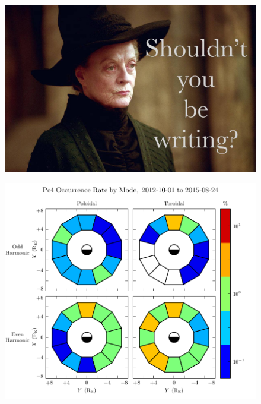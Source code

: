 \begin{figure}[!htb]
    \centering
    \includegraphics[width=\textwidth]{figures/placeholder.jpg}
    \caption[Distribution of Events by Spectral Width]{
    }
    \label{fig_fwhm}
\end{figure}






\begin{figure}[!htb]
    \centering
    \includegraphics[width=\textwidth]{figures/rate.pdf}
    \caption[Pc4 Incidence by Mode]{
      \todo{$\cdots$}
    }
    \label{fig_rate}
\end{figure}


